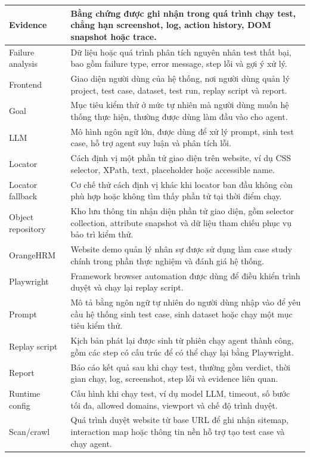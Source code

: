 {\begin{longtable}{|p{4.2cm}|p{10.0cm}|}
\hline
Evidence & Bằng chứng được ghi nhận trong quá trình chạy test, chẳng hạn screenshot, log, action history, DOM snapshot hoặc trace. \\
\hline
Failure analysis & Dữ liệu hoặc quá trình phân tích nguyên nhân test thất bại, bao gồm failure type, error message, step lỗi và gợi ý xử lý. \\
\hline
Frontend & Giao diện người dùng của hệ thống, nơi người dùng quản lý project, test case, dataset, test run, replay script và report. \\
\hline
Goal & Mục tiêu kiểm thử ở mức tự nhiên mà người dùng muốn hệ thống thực hiện, thường được dùng làm đầu vào cho agent. \\
\hline
LLM & Mô hình ngôn ngữ lớn, được dùng để xử lý prompt, sinh test case, hỗ trợ agent suy luận và phân tích lỗi. \\
\hline
Locator & Cách định vị một phần tử giao diện trên website, ví dụ CSS selector, XPath, text, placeholder hoặc accessible name. \\
\hline
Locator fallback & Cơ chế thử cách định vị khác khi locator ban đầu không còn phù hợp hoặc không tìm thấy phần tử tại thời điểm chạy. \\
\hline
Object repository & Kho lưu thông tin nhận diện phần tử giao diện, gồm selector collection, attribute snapshot và dữ liệu tham chiếu phục vụ bảo trì kiểm thử. \\
\hline
OrangeHRM & Website demo quản lý nhân sự được sử dụng làm case study chính trong phần thực nghiệm và đánh giá hệ thống. \\
\hline
Playwright & Framework browser automation được dùng để điều khiển trình duyệt và chạy lại replay script. \\
\hline
Prompt & Mô tả bằng ngôn ngữ tự nhiên do người dùng nhập vào để yêu cầu hệ thống sinh test case, sinh dataset hoặc chạy một mục tiêu kiểm thử. \\
\hline
Replay script & Kịch bản phát lại được sinh từ phiên chạy agent thành công, gồm các step có cấu trúc để có thể chạy lại bằng Playwright. \\
\hline
Report & Báo cáo kết quả sau khi chạy test, thường gồm verdict, thời gian chạy, log, screenshot, step lỗi và evidence liên quan. \\
\hline
Runtime config & Cấu hình khi chạy test, ví dụ model LLM, timeout, số bước tối đa, allowed domains, viewport và chế độ trình duyệt. \\
\hline
Scan/crawl & Quá trình duyệt website từ base URL để ghi nhận sitemap, interaction map hoặc thông tin nền hỗ trợ tạo test case và chạy agent. \\

\end{longtable}}
